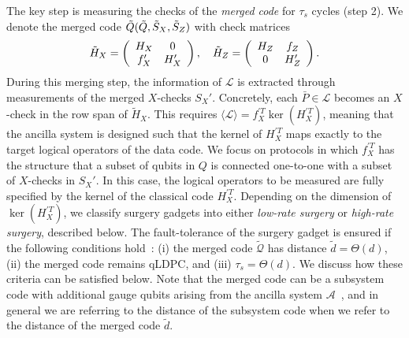 \documentclass[reprint,twocolumn,secnumarabic,amssymb, aps, prx]{revtex4-2}
\newcommand{\taus}{\tau_s}
\begin{document}
The key step is measuring the checks of the \emph{merged code} for $\taus$ cycles (step 2). We denote the merged code $\Tilde{Q}(\Tilde{Q},\Tilde{S}_X, \Tilde{S}_Z)$ with check matrices
\begin{equation}
    \Tilde{H}_X = \left( \begin{array}{cc}
        H_X & 0 \\
        f_X^{\prime} & H_X^{\prime}
    \end{array}\right),
    \quad 
     \Tilde{H}_Z = \left( \begin{array}{cc}
        H_Z & f_Z \\
        0 & H_Z^{\prime}
    \end{array}\right).
\end{equation}
During this merging step, the information of $\mathcal{L}$ is extracted through measurements of the merged $X$-checks $S_X'$. Concretely, each $\bar{P} \in \mathcal{L}$ becomes an $X$-check in the row span of $\tilde{H}_X$. This requires $\langle \mathcal{L} \rangle = f_X^{\prime T}\ker(H_X^{\prime T})$, meaning that the ancilla system is designed such that the kernel of $H_X^{\prime T}$ maps exactly to the target logical operators of the data code. We focus on protocols in which $f_X^{\prime T}$ has the structure that a subset of qubits in $Q$ is connected one-to-one with a subset of $X$-checks in $S_X'$. In this case, the logical operators to be measured are fully specified by the kernel of the classical code $H_X^{\prime T}$. Depending on the dimension of $\ker(H_X^{\prime T})$, we classify surgery gadgets into either \emph{low-rate surgery} or \emph{high-rate surgery}, described below. The fault-tolerance of the surgery gadget is ensured if the following conditions hold~\cite{cross2024improved, he2025extractors, zheng2025high}: (i) the merged code $\tilde{\mathcal{Q}}$ has distance $\tilde d = \Theta(d)$, (ii) the merged code remains qLDPC, and (iii) $\taus = \Theta(d)$. We discuss how these criteria can be satisfied below. Note that the merged code can be a subsystem code with additional gauge qubits arising from the ancilla system $\mathcal{A}$~\cite{cohen2022low, ide2024fault, zheng2025high}, and in general we are referring to the distance of the subsystem code when we refer to the distance of the merged code $\tilde{d}$.
\end{document}
